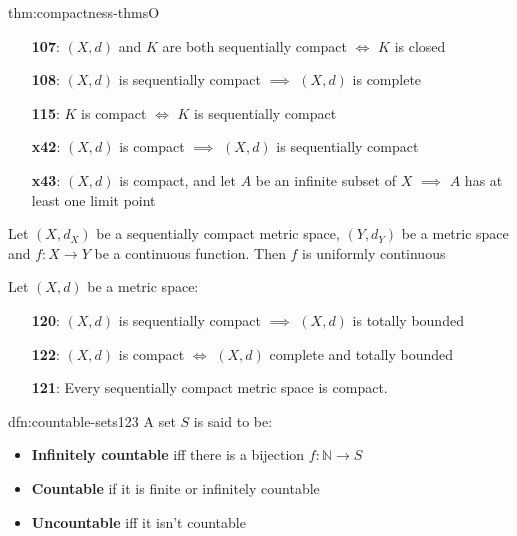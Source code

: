 \documentclass[landscape, 8pt]{extarticle}
\begin{document}
\begin{multicols}{3}
\begin{thm}{thm:compactness-thms}{O}
\begin{itemize}[leftmargin=1.5em]
        \item[\textbf{107}:] $(X, d)$ and $K$ are both sequentially compact $\iff$ $K$ is closed

        \item[\textbf{108}:] $(X, d)$ is sequentially compact $\implies$ $(X, d)$ is complete

    \item[\textbf{115}:] $K$ is compact $\iff$ $K$ is sequentially compact

    \item[\textbf{x42}:] $(X, d)$ is compact $\implies$ $(X, d)$ is sequentially compact

    \item[\textbf{x43}:] $(X, d)$ is compact, and let $A$ be an infinite subset of $X$ $\implies$ $A$ has at least one limit point
    \end{itemize}

    \vspace{-5pt}
    \vspace{-2pt}

    Let $(X, d_{X})$ be a sequentially compact metric space, $(Y, d_{Y})$ be a metric space and $f : X\to Y$ be a continuous function. Then $f$ is uniformly continuous

    \vspace{-3pt}

    Let $(X, d)$ be a metric space:
    \vspace{-5pt}
    \begin{itemize}[leftmargin=1.5em]
        \item[\textbf{120}:] $(X, d)$ is sequentially compact $\implies$ $(X, d)$ is totally bounded
        \item[\textbf{122}:] $(X, d)$ is compact $\iff$ $(X, d)$ complete and totally bounded
        \item[\textbf{121}:] Every sequentially compact metric space is compact.
    \end{itemize}
\end{thm}

\newpage


\begin{dfn}{dfn:countable-sets}{123}
    \vspace{-5pt}
    A set $S$ is said to be:
    \vspace{-5pt}
    \begin{itemize}
        \item \textbf{Infinitely countable} iff there is a bijection $f : \mathbb{N} \to S$
        \item \textbf{Countable} if it is finite or infinitely countable
        \item \textbf{Uncountable} iff it isn't countable
    \end{itemize}


\end{dfn}
\end{multicols}
\end{document}
